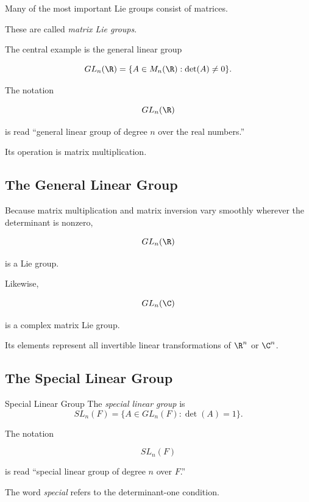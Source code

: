 Many of the most important Lie groups consist of matrices.

These are called \emph{matrix Lie groups}.

The central example is the general linear group

\[ GL_n(\R)=\{A\in M_n(\R):\det(A)\neq0\}. \]

The notation

\[ GL_n(\R) \]

is read ``general linear group of degree \(n\) over the real numbers.''

Its operation is matrix multiplication.

\subsection{The General Linear Group}
\label{subsec:general-linear-lie-group}

Because matrix multiplication and matrix inversion vary smoothly wherever the
determinant is nonzero,

\[ GL_n(\R) \]

is a Lie group.

Likewise,

\[ GL_n(\C) \]

is a complex matrix Lie group.

Its elements represent all invertible linear transformations of
\(\R^n\) or \(\C^n\).

\subsection{The Special Linear Group}
\label{subsec:special-linear-group}

\begin{definitionbox}{Special Linear Group}
The \emph{special linear group} is
\[ SL_n(F)=\{A\in GL_n(F):\det(A)=1\}. \]
\end{definitionbox}

The notation

\[ SL_n(F) \]

is read ``special linear group of degree \(n\) over \(F\).''

The word \emph{special} refers to the determinant-one condition.

